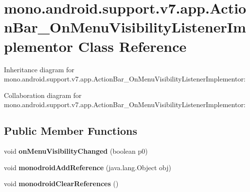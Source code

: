 \hypertarget{classmono_1_1android_1_1support_1_1v7_1_1app_1_1_action_bar___on_menu_visibility_listener_implementor}{}\section{mono.\+android.\+support.\+v7.\+app.\+Action\+Bar\+\_\+\+On\+Menu\+Visibility\+Listener\+Implementor Class Reference}
\label{classmono_1_1android_1_1support_1_1v7_1_1app_1_1_action_bar___on_menu_visibility_listener_implementor}


Inheritance diagram for mono.\+android.\+support.\+v7.\+app.\+Action\+Bar\+\_\+\+On\+Menu\+Visibility\+Listener\+Implementor\+:


Collaboration diagram for mono.\+android.\+support.\+v7.\+app.\+Action\+Bar\+\_\+\+On\+Menu\+Visibility\+Listener\+Implementor\+:
\subsection*{Public Member Functions}
\begin{DoxyCompactItemize}
\item 
\mbox{\label{classmono_1_1android_1_1support_1_1v7_1_1app_1_1_action_bar___on_menu_visibility_listener_implementor_a273ad4963b11410f46b1e918b47526e5}} 
void {\bfseries on\+Menu\+Visibility\+Changed} (boolean p0)
\item 
\mbox{\label{classmono_1_1android_1_1support_1_1v7_1_1app_1_1_action_bar___on_menu_visibility_listener_implementor_a120bb639390d4992edfcf6749c839108}} 
void {\bfseries monodroid\+Add\+Reference} (java.\+lang.\+Object obj)
\item 
\mbox{\label{classmono_1_1android_1_1support_1_1v7_1_1app_1_1_action_bar___on_menu_visibility_listener_implementor_a888aa1c7efc221057deab7c4d44d1e86}} 
void {\bfseries monodroid\+Clear\+References} ()
\end{DoxyCompactItemize}
